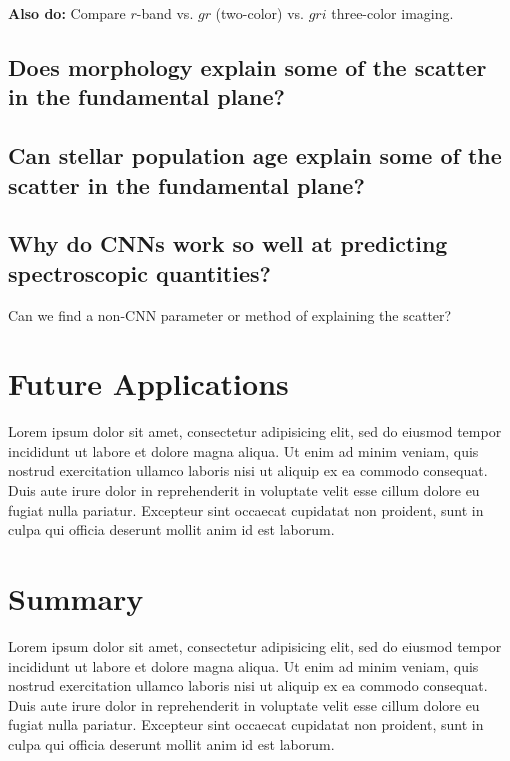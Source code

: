 \documentclass[fleqn,usenatbib]{mnras}
\begin{document}
\textbf{Also do:} Compare $r$-band vs. $gr$ (two-color) vs. $gri$ three-color imaging.


\subsection{Does morphology explain some of the scatter in the fundamental plane?}

\subsection{Can stellar population age explain some of the scatter in the fundamental plane?}

\subsection{Why do CNNs work so well at predicting spectroscopic quantities?}
Can we find a non-CNN parameter or method of explaining the scatter?

\section{Future Applications}\label{sec:future}
Lorem ipsum dolor sit amet, consectetur adipisicing elit, sed do eiusmod tempor incididunt ut labore et dolore magna aliqua. Ut enim ad minim veniam, quis nostrud exercitation ullamco laboris nisi ut aliquip ex ea commodo consequat. Duis aute irure dolor in reprehenderit in voluptate velit esse cillum dolore eu fugiat nulla pariatur. Excepteur sint occaecat cupidatat non proident, sunt in culpa qui officia deserunt mollit anim id est laborum.

\section{Summary}\label{sec:summary}
Lorem ipsum dolor sit amet, consectetur adipisicing elit, sed do eiusmod tempor incididunt ut labore et dolore magna aliqua. Ut enim ad minim veniam, quis nostrud exercitation ullamco laboris nisi ut aliquip ex ea commodo consequat. Duis aute irure dolor in reprehenderit in voluptate velit esse cillum dolore eu fugiat nulla pariatur. Excepteur sint occaecat cupidatat non proident, sunt in culpa qui officia deserunt mollit anim id est laborum.
\end{document}
